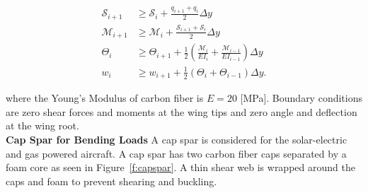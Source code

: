 % 
% 
%  

\begin{align}
    \label{e:sheargp}
    \mathcal{S}_{i+1} &\geq \mathcal{S}_i + \frac{q_{i+1} + q_i}{2} \Delta y \\
    \label{e:momentgp}
    \mathcal{M}_{i+1} &\geq \mathcal{M}_i + \frac{\mathcal{S}_{i+1} + \mathcal{S}_i}{2} \Delta y \\
    \label{e:anglegp}
    \Theta_{i} &\geq \Theta_{i+1} + \frac{1}{2} \left(\frac{\mathcal{M}_i}{EI_i} + \frac{\mathcal{M}_{i-1}}{EI_{i-1}} \right) \Delta y \\
    \label{e:deflection}
    w_{i} &\geq w_{i+1} + \frac{1}{2} (\Theta_i + \Theta_{i-1}) \Delta y .
\end{align}

where the Young's Modulus of carbon fiber is $E = 20$ [MPa]. Boundary conditions are zero shear forces and moments at the wing tips and zero angle and deflection at the wing root.\cite{bending} \\

\textbf{Cap Spar for Bending Loads} 
A cap spar is considered for the solar-electric and gas powered aircraft.  A cap spar has two carbon fiber caps separated by a foam core as seen in Figure~\ref{f:capspar}. A thin shear web is wrapped around the caps and foam to prevent shearing and buckling.

